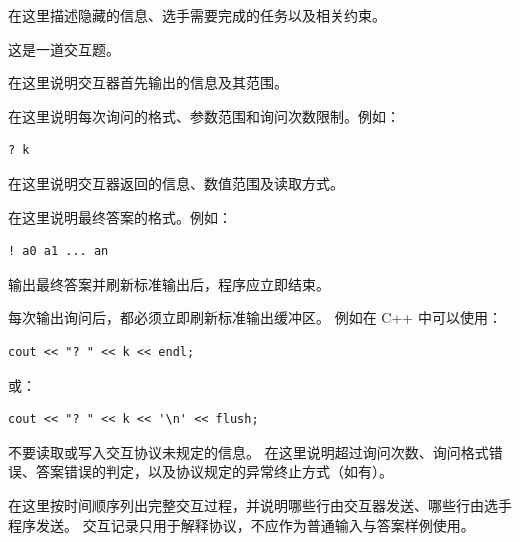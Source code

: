 在这里描述隐藏的信息、选手需要完成的任务以及相关约束。

\interactor

这是一道交互题。

\InteractionStart

在这里说明交互器首先输出的信息及其范围。

\InteractionQuery

在这里说明每次询问的格式、参数范围和询问次数限制。例如：
\begin{verbatim}
? k
\end{verbatim}

在这里说明交互器返回的信息、数值范围及读取方式。

\InteractionAnswer

在这里说明最终答案的格式。例如：
\begin{verbatim}
! a0 a1 ... an
\end{verbatim}

输出最终答案并刷新标准输出后，程序应立即结束。

\InteractionNotes

每次输出询问后，都必须立即刷新标准输出缓冲区。
例如在 C++ 中可以使用：
\begin{verbatim}
cout << "? " << k << endl;
\end{verbatim}

或：
\begin{verbatim}
cout << "? " << k << '\n' << flush;
\end{verbatim}

不要读取或写入交互协议未规定的信息。
在这里说明超过询问次数、询问格式错误、答案错误的判定，以及协议规定的异常终止方式（如有）。

\InteractionExample

在这里按时间顺序列出完整交互过程，并说明哪些行由交互器发送、哪些行由选手程序发送。
交互记录只用于解释协议，不应作为普通输入与答案样例使用。
